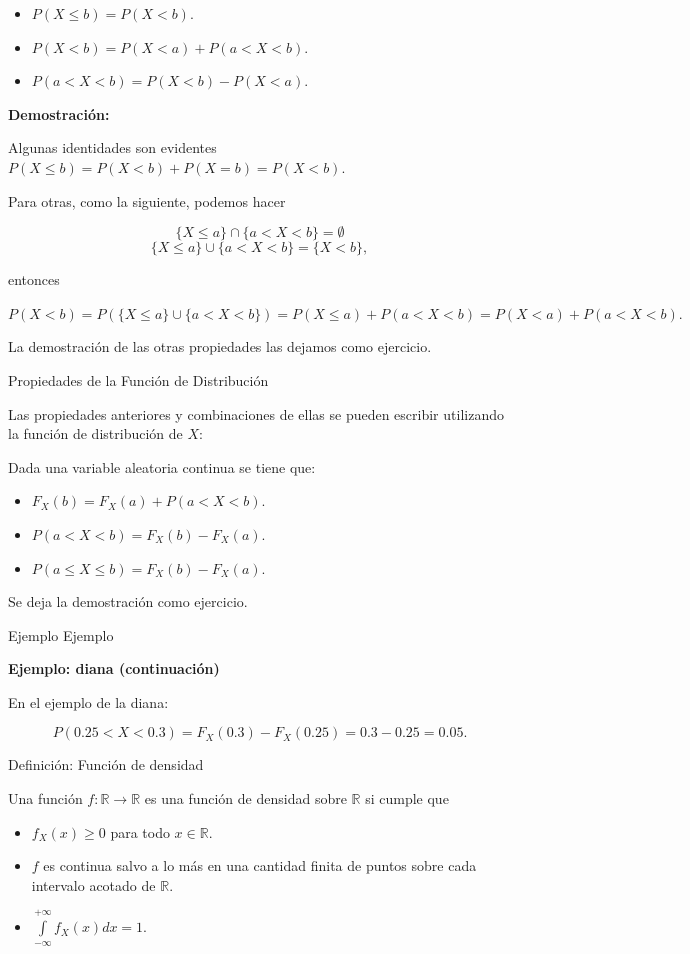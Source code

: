 \documentclass[
  letterpaper,
  DIV=11,
  numbers=noendperiod]{scrreprt}
\providecommand{\tightlist}{%
  \setlength{\itemsep}{0pt}\setlength{\parskip}{0pt}}\usepackage{longtable,booktabs,array}
\begin{document}
\begin{itemize}
\tightlist
\item
  \(P(X\leq b)=P(X<b)\).
\item
  \(P(X<b)=P(X<a)+P(a<X<b)\).
\item
  \(P(a<X<b)=P(X<b)-P(X<a)\).
\end{itemize}

\textbf{Demostración:}

Algunas identidades son evidentes \(P(X\leq b)=P(X<b)+P(X=b)=P(X<b).\)

Para otras, como la siguiente, podemos hacer

\[\{X\leq a\}\cap \{a<X<b\}=\emptyset\]
\[\{X\leq a\}\cup \{a<X<b\}=\{X<b\},\]

entonces

\(P(X< b)= P(\{X\leq a\}\cup \{a<X<b\}) = P(X\leq a)+P(a<X<b)= P(X< a)+P(a<X<b).\)

La demostración de las otras propiedades las dejamos como ejercicio.

Propiedades de la Función de Distribución

Las propiedades anteriores y combinaciones de ellas se pueden escribir
utilizando la función de distribución de \(X\):

Dada una variable aleatoria continua se tiene que:

\begin{itemize}
\tightlist
\item
  \(F_{X}(b)=F_{X}(a)+P(a<X<b)\).
\item
  \(P(a<X<b)=F_{X}(b)-F_{X}(a)\).
\item
  \(P(a\leq X\leq b)=F_{X}(b)-F_{X}(a)\).
\end{itemize}

Se deja la demostración como ejercicio.

Ejemplo Ejemplo

\textbf{Ejemplo: diana (continuación)}

En el ejemplo de la diana:

\[P(0.25<X<0.3)=F_{X}(0.3)-F_{X}(0.25)=0.3-0.25=0.05.\]

Definición: Función de densidad

Una función \(f:\mathbb{R}\to\mathbb{R}\) es una función de densidad
sobre \(\mathbb{R}\) si cumple que

\begin{itemize}
\tightlist
\item
  \(f_{X}(x)\geq 0\) para todo \(x \in\mathbb{R}.\)
\item
  \(f\) es continua salvo a lo más en una cantidad finita de puntos
  sobre cada intervalo acotado de \(\mathbb{R}\).
\item
  \(\displaystyle\int\limits_{-\infty}^{+\infty} f_{X}(x) dx=1.\)
\end{itemize}
\end{document}

